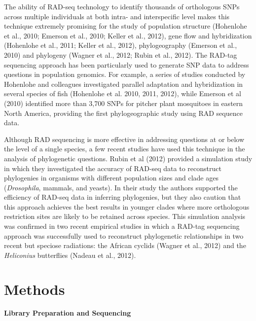 \documentclass[12pt]{article}
\begin{document}
The ability of RAD-seq technology to identify thousands of orthologous SNPs across multiple individuals at both intra- and interspecific level makes this technique extremely promising for the study of population structure (Hohenlohe et al., 2010; Emerson et al., 2010; Keller et al., 2012), gene flow and hybridization (Hohenlohe et al., 2011; Keller et al., 2012), phylogeography (Emerson et al., 2010) and phylogeny (Wagner et al., 2012; Rubin et al., 2012). The RAD-tag sequencing approach has been particularly used to generate SNP data to address questions in population genomics. For example, a series of studies conducted by Hohenlohe and colleagues investigated parallel adaptation and hybridization in several species of fish (Hohenlohe et al. 2010, 2011, 2012), while Emerson et al (2010) identified more than 3,700 SNPs for pitcher plant mosquitoes in eastern North America, providing the first phylogeographic study using RAD sequence data. 

Although RAD sequencing is more effective in addressing questions at or below the level of a single species, a few recent studies have used this technique in the analysis of phylogenetic questions. Rubin et al (2012) provided a simulation study in which they investigated the accuracy of RAD-seq data to reconstruct phylogenies in organisms with different population sizes and clade ages (\emph{Drosophila}, mammals, and yeasts). In their study the authors supported the efficiency of RAD-seq data in inferring phylogenies, but they also caution that this approach achieves the best results in younger clades where more orthologous restriction sites are likely to be retained across species. This simulation analysis was confirmed in two recent empirical studies in which a RAD-tag sequencing approach was successfully used to reconstruct phylogenetic relationships in two recent but speciose radiations: the African cyclids (Wagner et al., 2012) and the \emph{Heliconius} butterﬂies (Nadeau et al., 2012).

\section{Methods}

\paragraph{Library Preparation and Sequencing}
\end{document}
